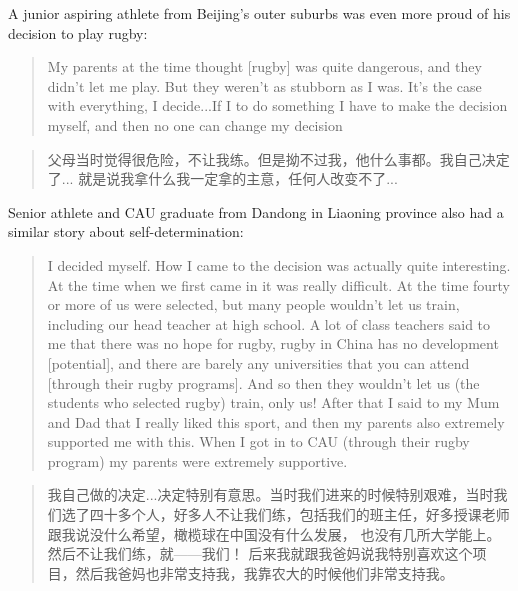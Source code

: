   A junior aspiring athlete from Beijing's outer suburbs was even more proud of his decision to play rugby:
  \begin{quotation}
    My parents at the time thought [rugby] was quite dangerous, and they didn't let me play.  But they weren't as stubborn as I was.  It's the case with everything, I decide...If I to do something I have to make the decision myself, and then no one can change my decision
  \end{quotation}

  \begin{CJK}{UTF8}{gbsn}
    \begin{quotation}
      父母当时觉得很危险，不让我练。但是拗不过我，他什么事都。我自己决定了...
      就是说我拿什么我一定拿的主意，任何人改变不了...
    \end{quotation}
  \end{CJK}


  Senior athlete and CAU graduate from Dandong in Liaoning province also had a similar story about self-determination:

  \begin{quotation}
    I decided myself. How I came to the decision was actually quite interesting.  At the time when we first came in it was really difficult.  At the time fourty or more of us were selected, but many people wouldn't let us train, including our head teacher at high school.  A lot of class teachers said to me that there was no hope for rugby, rugby in China has no development [potential], and there are barely any universities that you can attend [through their rugby programs].  And so then they wouldn't let us (the students who selected rugby) train, only us! After that I said to my Mum and Dad that I really liked this sport, and then my parents also extremely supported me with this.  When I got in to CAU (through their rugby program) my parents were extremely supportive.
  \end{quotation}

  \begin{CJK}{UTF8}{gbsn}
    \begin{quotation}
      我自己做的决定...决定特别有意思。当时我们进来的时候特别艰难，当时我们选了四十多个人，好多人不让我们练，包括我们的班主任，好多授课老师跟我说没什么希望，橄榄球在中国没有什么发展， 也没有几所大学能上。然后不让我们练，就——我们！ 后来我就跟我爸妈说我特别喜欢这个项目，然后我爸妈也非常支持我，我靠农大的时候他们非常支持我。
    \end{quotation}
  \end{CJK}

